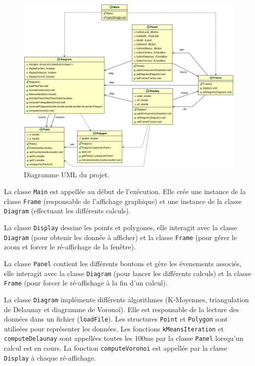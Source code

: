 \documentclass[a4paper]{article}
\begin{document}
  \begin{figure}[h]
    \centering
    \includegraphics[width=15cm]{../UML.jpg}
    \caption{Diagramme UML du projet.}
  \end{figure}

  La classe \verb|Main| est appellée au début de l'exécution. Elle crée une instance de la classe \verb|Frame| (responsable de l'affichage graphique) et une instance de la classe \verb|Diagram| (effectuant les différents calculs).

  La classe \verb|Display| dessine les points et polygones, elle interagit avec la classe \verb|Diagram| (pour obtenir les donnée à afficher) et la classe \verb|Frame| (pour gérer le zoom et forcer le ré-affichage de la fenêtre).

  La classe \verb|Panel| contient les différents boutons et gère les évenements associés, elle interagit avec la classe \verb|Diagram| (pour lancer les différents calculs) et la classe \verb|Frame| (pour forcer le ré-affichage à la fin d'un calcul).

  La classe \verb|Diagram| implémente différents algorithmes (K-Moyennes, triangulation de Delaunay et diagramme de Voronoï). Elle est responsable de la lecture des données dans un fichier (\verb|loadFile|). Les structures \verb|Point| et \verb|Polygon| sont utilisées pour représenter les données. Les fonctions \verb|kMeansIteration| et \verb|computeDelaunay| sont appellées toutes les 100ms par la classe \verb|Panel| lorsqu'un calcul est en cours. La fonction \verb|computeVoronoi| est appellée par la classe \verb|Display| à chaque ré-affichage.
\end{document}
